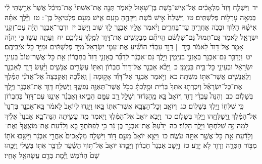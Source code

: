 \documentclass[18pt]{article}
\newcommand{\kri}[1]{\Afootnote{#1}}	%
\begin{document}
 {\loc יד~}וַיִּשְׁלַ֤ח דָּוִד֙ מַלְאָכִ֔ים אֶל־אִֽישׁ־בֹּ֥שֶׁת בֶּן־שָׁא֖וּל לֵאמֹ֑ר תְּנָ֤ה אֶת־אִשְׁתִּי֙ אֶת־מִיכַ֔ל אֲשֶׁר֙ אֵרַ֣שְׂתִּי לִ֔י בְּמֵאָ֖ה עׇרְל֥וֹת פְּלִשְׁתִּֽים׃ \startlock
 {\loc טו~}וַיִּשְׁלַח֙ אִ֣ישׁ בֹּ֔שֶׁת וַיִּקָּחֶ֖הָ מֵ֣עִֽם אִ֑ישׁ מֵעִ֖ם פַּלְטִיאֵ֥ל בֶּן־ \edtext{(לוש)}{\kri{קרי: לָֽיִשׁ}} ׃ \startlock
 {\loc טז~}וַיֵּ֨לֶךְ אִתָּ֜הּ אִישָׁ֗הּ הָל֧וֹךְ וּבָכֹ֛ה אַחֲרֶ֖יהָ עַד־בַּחֻרִ֑ים וַיֹּ֨אמֶר אֵלָ֥יו אַבְנֵ֛ר לֵ֥ךְ שׁ֖וּב וַיָּשֹֽׁב׃ \startlock
 {\loc יז~}וּדְבַר־אַבְנֵ֣ר הָיָ֔ה עִם־זִקְנֵ֥י יִשְׂרָאֵ֖ל לֵאמֹ֑ר גַּם־תְּמוֹל֙ גַּם־שִׁלְשֹׁ֔ם הֱיִיתֶ֞ם מְבַקְשִׁ֧ים אֶת־דָּוִ֛ד לְמֶ֖לֶךְ עֲלֵיכֶֽם׃ \startlock
 {\loc יח~}וְעַתָּ֖ה עֲשׂ֑וּ כִּ֣י יְהֹוָ֗ה אָמַ֤ר אֶל־דָּוִד֙ לֵאמֹ֔ר בְּיַ֣ד  |  דָּוִ֣ד עַבְדִּ֗י הוֹשִׁ֜יעַ אֶת־עַמִּ֤י יִשְׂרָאֵל֙ מִיַּ֣ד פְּלִשְׁתִּ֔ים וּמִיַּ֖ד כׇּל־אֹיְבֵיהֶֽם׃ \startlock
 {\loc יט~}וַיְדַבֵּ֥ר גַּם־אַבְנֵ֖ר בְּאׇזְנֵ֣י בִנְיָמִ֑ין וַיֵּ֣לֶךְ גַּם־אַבְנֵ֗ר לְדַבֵּ֞ר בְּאׇזְנֵ֤י דָוִד֙ בְּחֶבְר֔וֹן אֵ֤ת כׇּל־אֲשֶׁר־טוֹב֙ בְּעֵינֵ֣י יִשְׂרָאֵ֔ל וּבְעֵינֵ֖י כׇּל־בֵּ֥ית בִּנְיָמִֽן׃ \startlock
 {\loc כ~}וַיָּבֹ֨א אַבְנֵ֤ר אֶל־דָּוִד֙ חֶבְר֔וֹן וְאִתּ֖וֹ עֶשְׂרִ֣ים אֲנָשִׁ֑ים וַיַּ֨עַשׂ דָּוִ֧ד לְאַבְנֵ֛ר וְלַאֲנָשִׁ֥ים אֲשֶׁר־אִתּ֖וֹ מִשְׁתֶּֽה׃ \startlock
 {\loc כא~}וַיֹּ֣אמֶר אַבְנֵ֣ר אֶל־דָּוִ֡ד אָק֣וּמָה  |  וְֽאֵלֵ֡כָה וְאֶקְבְּצָה֩ אֶל־אֲדֹנִ֨י הַמֶּ֜לֶךְ אֶת־כׇּל־יִשְׂרָאֵ֗ל וְיִכְרְת֤וּ אִתְּךָ֙ בְּרִ֔ית וּמָ֣לַכְתָּ֔ בְּכֹ֥ל אֲשֶׁר־תְּאַוֶּ֖ה נַפְשֶׁ֑ךָ וַיְשַׁלַּ֥ח דָּוִ֛ד אֶת־אַבְנֵ֖ר וַיֵּ֥לֶךְ בְּשָׁלֽוֹם׃ \startlock
 {\loc כב~}וְהִנֵּה֩ עַבְדֵ֨י דָוִ֤ד וְיוֹאָב֙ בָּ֣א מֵֽהַגְּד֔וּד וְשָׁלָ֥ל רָ֖ב עִמָּ֣ם הֵבִ֑יאוּ וְאַבְנֵ֗ר אֵינֶ֤נּוּ עִם־דָּוִד֙ בְּחֶבְר֔וֹן כִּ֥י שִׁלְּח֖וֹ וַיֵּ֥לֶךְ בְּשָׁלֽוֹם׃ \startlock
 {\loc כג~}וְיוֹאָ֛ב וְכׇל־הַצָּבָ֥א אֲשֶׁר־אִתּ֖וֹ בָּ֑אוּ וַיַּגִּ֤דוּ לְיוֹאָב֙ לֵאמֹ֔ר בָּֽא־אַבְנֵ֤ר בֶּן־נֵר֙ אֶל־הַמֶּ֔לֶךְ וַֽיְשַׁלְּחֵ֖הוּ וַיֵּ֥לֶךְ בְּשָׁלֽוֹם׃ \startlock
 {\loc כד~}וַיָּבֹ֤א יוֹאָב֙ אֶל־הַמֶּ֔לֶךְ וַיֹּ֖אמֶר מֶ֣ה עָשִׂ֑יתָה הִנֵּה־בָ֤א אַבְנֵר֙ אֵלֶ֔יךָ לָמָּה־זֶּ֥ה שִׁלַּחְתּ֖וֹ וַיֵּ֥לֶךְ הָלֽוֹךְ׃ \startlock
 {\loc כה~}יָדַ֙עְתָּ֙ אֶת־אַבְנֵ֣ר בֶּן־נֵ֔ר כִּ֥י לְפַתֹּתְךָ֖ בָּ֑א וְלָדַ֜עַת אֶת־מוֹצָֽאֲךָ֙ וְאֶת־ \edtext{(מבואך)}{\kri{קרי: מ֣וֹבָאֶ֔ךָ}}  וְלָדַ֕עַת אֵ֛ת כׇּל־אֲשֶׁ֥ר אַתָּ֖ה עֹשֶֽׂה׃ \startlock
 {\loc כו~}וַיֵּצֵ֤א יוֹאָב֙ מֵעִ֣ם דָּוִ֔ד וַיִּשְׁלַ֤ח מַלְאָכִים֙ אַחֲרֵ֣י אַבְנֵ֔ר וַיָּשִׁ֥בוּ אֹת֖וֹ מִבּ֣וֹר הַסִּרָ֑ה וְדָוִ֖ד לֹ֥א יָדָֽע׃ \startlock
 {\loc כז~}וַיָּ֤שׇׁב אַבְנֵר֙ חֶבְר֔וֹן וַיַּטֵּ֤הוּ יוֹאָב֙ אֶל־תּ֣וֹךְ הַשַּׁ֔עַר לְדַבֵּ֥ר אִתּ֖וֹ בַּשֶּׁ֑לִי וַיַּכֵּ֤הוּ שָׁם֙ הַחֹ֔מֶשׁ וַיָּ֕מׇת בְּדַ֖ם עֲשָׂהאֵ֥ל אָחִֽיו׃ \startlock
\end{document}
